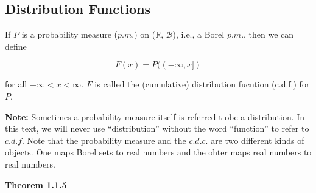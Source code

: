 \documentclass[
]{book}
\begin{document}
\hypertarget{distribution-functions}{%
\subsection{Distribution Functions}\label{distribution-functions}}

If \(P\) is a probability measure (\(p.m.\)) on (\(\mathbb{R}\), \(\mathcal{B}\)), i.e., a Borel \(p.m.\), then we can define

\[F(x)=P((-\infty, x])\]

for all \(-\infty < x < \infty\). \(F\) is called the (cumulative) distribution fucntion (c.d.f.) for \(P\).

\textbf{Note:} Sometimes a probability measure itself is referred t obe a distribution. In this text, we will never use ``distribution'' without the word ``function'' to refer to \(c.d.f.\) Note that the probability measure and the \(c.d.c.\) are two different kinds of objects. One maps Borel sets to real numbers and the ohter maps real numbers to real numbers.

\textbf{Theorem 1.1.5}

\backmatter
  
\end{document}
